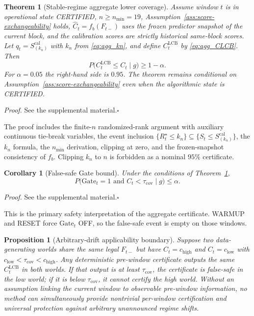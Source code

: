 \documentclass[letterpaper,journal]{IEEEtran}
\newtheorem{theorem}{Theorem}
\newtheorem{proposition}{Proposition}
\newtheorem{corollary}{Corollary}
\begin{document}
\begin{theorem}[Stable-regime aggregate lower coverage]
\label{thm:agg-lcb}
Assume window $t$ is in operational state CERTIFIED, $n\ge n_{\min}=19$,
Assumption~\ref{ass:score-exchangeability} holds, $\widehat C_t=f_b(F_{t-})$
uses the frozen predictor snapshot of the current block, and the calibration
scores are strictly historical same-block scores.  Let
$q_t=S_{(k_n)}^{\mathrm{cal}}$ with $k_n$ from \eqref{eq:agg_kn}, and define
$C^{\mathrm{LCB}}_t$ by \eqref{eq:agg_CLCB}.  Then
\begin{equation}
 P\bigl(C^{\mathrm{LCB}}_t\le C_t\mid g\bigr)\ge 1-\alpha.
 \label{eq:agg_thm1}
\end{equation}
For $\alpha=0.05$ the right-hand side is $0.95$.  The theorem remains
conditional on Assumption~\ref{ass:score-exchangeability} even when the
algorithmic state is CERTIFIED.
\end{theorem}

\noindent\emph{Proof.}
See the supplemental material.\hfill$\square$

The proof includes the finite-$n$ randomized-rank argument with auxiliary
continuous tie-break variables, the event inclusion
$\{R_t^\star\le k_n\}\subseteq\{S_t\le S_{(k_n)}^{\mathrm{cal}}\}$,
the $k_n$ formula, the $n_{\min}$ derivation, clipping at zero, and the
frozen-snapshot consistency of $f_b$.  Clipping $k_n$ to $n$ is forbidden as a
nominal $95\%$ certificate.

\begin{corollary}[False-safe Gate bound]
\label{cor:false-safe-gate}
Under the conditions of Theorem~\ref{thm:agg-lcb},
\begin{equation}
 P\bigl(\mathrm{Gate}_t=1\text{ and }C_t<\tau_{\mathrm{cov}}\mid g\bigr)
 \le\alpha.
 \label{eq:agg_cor2}
\end{equation}
\end{corollary}

\noindent\emph{Proof.}
See the supplemental material.\hfill$\square$

This is the primary safety interpretation of the aggregate certificate.
WARMUP and RESET force $\mathrm{Gate}_t$ OFF, so the false-safe event is empty
on those windows.

\begin{proposition}[Arbitrary-drift applicability boundary]
\label{prop:drift-boundary}
Suppose two data-generating worlds share the same legal $F_{t-}$ but have
$C_t=c_{\mathrm{high}}$ and $C_t=c_{\mathrm{low}}$ with
$c_{\mathrm{low}}<\tau_{\mathrm{cov}}<c_{\mathrm{high}}$.  Any deterministic
pre-window certificate outputs the same $C^{\mathrm{LCB}}_t$ in both worlds.
If that output is at least $\tau_{\mathrm{cov}}$, the certificate is
false-safe in the low world; if it is below $\tau_{\mathrm{cov}}$, it cannot
certify the high world.  Without an assumption linking the current window to
observable pre-window information, no method can simultaneously provide
nontrivial per-window certification and universal protection against
arbitrary unannounced regime shifts.
\end{proposition}
\end{document}
